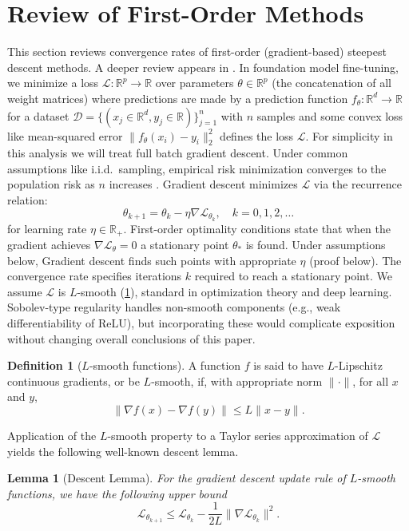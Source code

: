 \documentclass{article}
\theoremstyle{plain}
\newtheorem{lemma}[theorem]{Lemma}
\theoremstyle{definition}
\newtheorem{definition}[theorem]{Definition}
\theoremstyle{remark}
\begin{document}
\section{Review of First-Order Methods}
\label{app:review-of-gradient-decent-methods}
This section reviews convergence rates of first-order (gradient-based) steepest descent methods. A deeper review appears in \citet{Wright_Recht_2022}. In foundation model fine-tuning, we minimize a loss $\mathcal{L}: \mathbb{R}^{p} \to \mathbb{R}$ over parameters $\theta \in \mathbb{R}^{p}$ (the concatenation of all weight matrices) where predictions are made by a prediction function $f_{\theta}: \mathbb{R}^d \to \mathbb{R}$ for a dataset $\mathcal{D} = \{(x_j \in \mathbb{R}^d, y_j \in\mathbb{R})\}_{j=1}^{n}$ with $n$ samples and some convex loss like mean-squared error $\|f_{\theta}(x_i) - y_i \|^2_2$ defines the loss $\mathcal{L}$. For simplicity in this analysis we will treat full batch gradient descent. Under common assumptions like i.i.d.\ sampling, empirical risk minimization converges to the population risk as $n$ increases \citep{bach2024learning}. Gradient descent minimizes $\mathcal{L}$ via the recurrence relation:
\[
\theta_{k+1} = \theta_{k} - \eta \nabla \mathcal{L}_{\theta_k}, \quad k = 0, 1, 2, \ldots
\]
for learning rate $\eta \in \mathbb{R}_+$. First-order optimality conditions state that when the gradient achieves $\nabla \mathcal{L}_{\theta} = 0$ a stationary point $\theta_*$ is found. Under assumptions below, Gradient descent finds such points with appropriate $\eta$ (proof below). The convergence rate specifies iterations $k$ required to reach a stationary point. We assume $\mathcal{L}$ is $L$-smooth (\cref{def:l-smooth}), standard in optimization theory and deep learning. Sobolev-type regularity handles non-smooth components (e.g., weak differentiability of ReLU), but incorporating these would complicate exposition without changing overall conclusions of this paper.

\begin{definition}[$L$-smooth functions]
\label{def:l-smooth}
A function $f$ is said to have $L$-Lipschitz continuous gradients, or be $L$-smooth, if, with appropriate norm $\|\cdot\|$, for all $x$ and $y$, \[
\|\nabla f(x) - \nabla f(y)\| \leq L\|x - y\|.
\]
\end{definition}

Application of the $L$-smooth property to a Taylor series approximation of $\mathcal{L} $ yields the following well-known descent lemma.

\begin{lemma}[Descent Lemma]
\label{lemma:descent-lemma}
For the gradient descent update rule of $L$-smooth functions, we have the following upper bound \[
\mathcal{L}_{\theta_{k + 1}} \leq \mathcal{L}_{\theta_k} - \frac{1}{2L} \|\nabla \mathcal{L}_{\theta_k}\|^2.
\]
\end{lemma}
\end{document}
